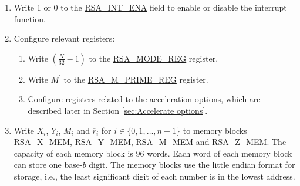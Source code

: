 \documentclass[main\_\_EN.tex]{subfiles}
\begin{document}
\begin{enumerate}

    \item Write 1 or 0 to the \hyperref[fielddesc:RSAINTENA]{RSA\_INT\_ENA} field to enable or disable the interrupt function.

    \item Configure relevant registers:

    \begin{enumerate}
        \item Write \begin{math}( \frac{N}{32} - 1 )\end{math} to the \hyperref[regdesc:RSAMODEREG]{RSA\_MODE\_REG} register.

        \item Write \begin{math}M^{\prime}\end{math} to the \hyperref[regdesc:RSAMPRIMEREG]{RSA\_M\_PRIME\_REG} register.

        \item Configure registers related to the acceleration options, which are described later in Section \ref{sec:Accelerate options}.

    \end{enumerate}

    \item Write
        \begin{math}X_{i}\end{math},
        \begin{math}Y_{i}\end{math},
        \begin{math}M_{i}\end{math} and
        \begin{math}\overline{r}_{i}\end{math} for \begin{math}i \in \{ 0, 1, \dots, n-1 \} \end{math}
        to memory blocks \hyperref[regdesc:RSAmemory]{RSA\_X\_MEM}, \hyperref[regdesc:RSAmemory]{RSA\_Y\_MEM}, \hyperref[regdesc:RSAmemory]{RSA\_M\_MEM} and \hyperref[regdesc:RSAmemory]{RSA\_Z\_MEM}. The capacity of each memory block is 96 words. Each word of each memory block can store one base-\begin{math}b\end{math} digit. The memory blocks use the little endian format for storage, i.e., the least significant digit of each number is in the lowest address.


\end{enumerate}
\end{document}
